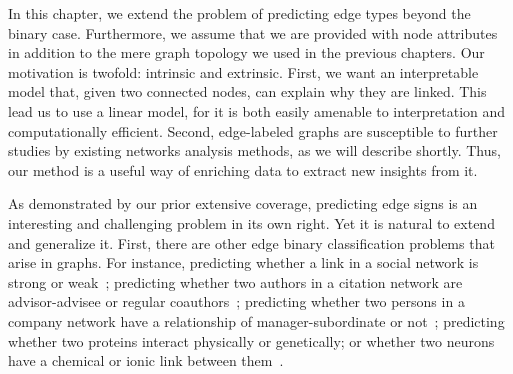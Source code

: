 In this chapter, we extend the problem of predicting edge types beyond the binary case.
Furthermore, we assume that we are provided with node attributes in addition to the mere graph
topology we used in the previous chapters. Our motivation is twofold: intrinsic and extrinsic.
First, we want an interpretable model that, given two connected nodes, can explain why they are
linked. This lead us to use a linear model, for it is both easily amenable to
interpretation and computationally efficient. Second, edge-labeled graphs are susceptible to further
studies by existing networks analysis methods, as we will describe shortly. Thus, our method is a
useful way of enriching data to extract new insights from it.

As demonstrated by our prior extensive coverage, predicting edge signs is an interesting and
challenging problem in its own right. Yet it is natural to extend and generalize it.  First, there
are other edge binary classification problems that arise in graphs. For instance, predicting whether
a link in a social network is strong or weak~\autocites{communityWeakTies14}{communityWeakTies17};
predicting whether two authors in a citation network are advisor-advisee or regular
coauthors~\autocite{Advisor10}; predicting whether two persons in a company network have a
relationship of manager-subordinate or not~\autocite{Manager07}; predicting whether two proteins
interact physically or genetically; or whether two neurons have a chemical or ionic link between
them~\autocite{BioMultiplex15}.

